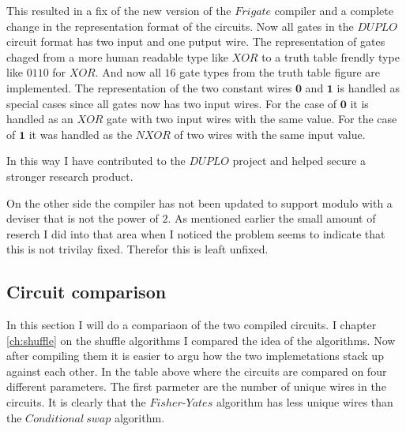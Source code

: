 This resulted in a fix of the new version of the $Frigate$ compiler and a complete change in the representation format of the circuits. Now all gates in the $DUPLO$ circuit format has two input and one putput wire. The representation of gates chaged from a more human readable type like $XOR$ to a truth table frendly type like $0110$ for $XOR$. And now all $16$ gate types from the truth table figure are implemented. The representation of the two constant wires $\textbf{0}$ and $\textbf{1}$ is handled as special cases since all gates now has two input wires. For the case of $\textbf{0}$ it is handled as an $XOR$ gate with two input wires with the same value. For the case of $\textbf{1}$ it was handled as the $NXOR$ of two wires with the same input value.

In this way I have contributed to the $DUPLO$ project and helped secure a stronger research product.

On the other side the compiler has not been updated to support modulo with a deviser that is not the power of $2$. As mentioned earlier the small amount of reserch I did into that area when I noticed the problem seems to indicate that this is not trivilay fixed. Therefor this is leaft unfixed.

\subsection{Circuit comparison}
\begin{table}
\label{circuit_gate_types}
\centering
{}
\caption{Compariason of the two implemented algorithms after compilation to $DUPLO$ circuits.}
\end{table}


In this section I will do a compariaon of the two compiled circuits. I chapter \ref{ch:shuffle} on the shuffle algorithms I compared the idea of the algorithms. Now after compiling them it is easier to argu how the two implemetations stack up against each other. In the table above where the circuits are compared on four different parameters. The first parmeter are the number of unique wires in the circuits. It is clearly that the $Fisher\text{-}Yates$ algorithm has less unique wires than the $Conditional~swap$ algorithm.

